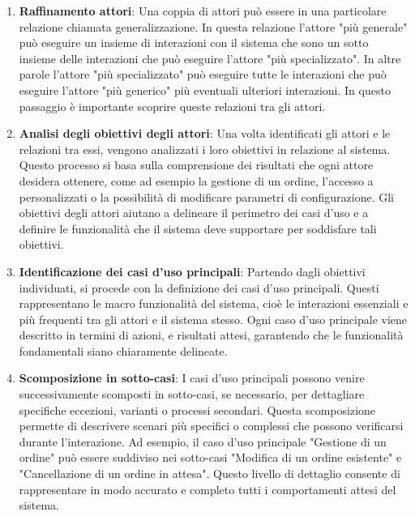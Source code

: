 \begin{enumerate}
    \item \textbf{Raffinamento attori}: Una coppia di attori può essere in una particolare relazione chiamata generalizzazione.
    In questa relazione l'attore "più generale" può eseguire un insieme di interazioni con il sistema che sono un sotto insieme delle interazioni che può eseguire l'attore "più specializzato".
    In altre parole l'attore "più specializzato" può eseguire tutte le interazioni che può eseguire l'attore "più generico" più eventuali ulteriori interazioni.
    In questo passaggio è importante scoprire queste relazioni tra gli attori.

    \item \textbf{Analisi degli obiettivi degli attori}: Una volta identificati gli attori e le relazioni tra essi, vengono analizzati i loro obiettivi in relazione al sistema. 
    Questo processo si basa sulla comprensione dei risultati che ogni attore desidera ottenere, come ad esempio la gestione di un ordine, l'accesso a  personalizzati o la possibilità di modificare parametri di configurazione.
    Gli obiettivi degli attori aiutano a delineare il perimetro dei casi d'uso e a definire le funzionalità che il sistema deve supportare per soddisfare tali obiettivi.

    \item \textbf{Identificazione dei casi d'uso principali}: Partendo dagli obiettivi individuati, si procede con la definizione dei casi d'uso principali. Questi rappresentano le macro funzionalità del sistema, cioè le interazioni essenziali e più frequenti tra gli attori e il sistema stesso. Ogni caso d'uso principale viene descritto in termini di azioni, e risultati attesi, garantendo che le funzionalità fondamentali siano chiaramente delineate.
    
    \item \textbf{Scomposizione in sotto-casi}: I casi d'uso principali possono venire successivamente scomposti in sotto-casi, se necessario, per dettagliare specifiche eccezioni, varianti o processi secondari. Questa scomposizione permette di descrivere scenari più specifici o complessi che possono verificarsi durante l'interazione. Ad esempio, il caso d'uso principale "Gestione di un ordine" può essere suddiviso nei sotto-casi "Modifica di un ordine esistente" e "Cancellazione di un ordine in attesa". Questo livello di dettaglio consente di rappresentare in modo accurato e completo tutti i comportamenti attesi del sistema.

\end{enumerate}

